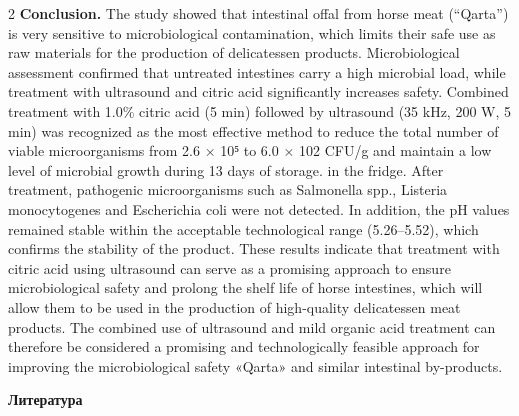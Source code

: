 \begin{multicols}{2}
{\bfseries Conclusion.} The study showed that intestinal offal from horse
meat (``Qarta'') is very sensitive to microbiological contamination,
which limits their safe use as raw materials for the production of
delicatessen products. Microbiological assessment confirmed that
untreated intestines carry a high microbial load, while treatment with
ultrasound and citric acid significantly increases safety. Combined
treatment with 1.0\% citric acid (5 min) followed by ultrasound (35 kHz,
200 W, 5 min) was recognized as the most effective method to reduce the
total number of viable microorganisms from 2.6 × 10⁵ to 6.0 × 102 CFU/g
and maintain a low level of microbial growth during 13 days of storage.
in the fridge. After treatment, pathogenic microorganisms such as
Salmonella spp., Listeria monocytogenes and Escherichia coli were not
detected. In addition, the pH values remained stable within the
acceptable technological range (5.26--5.52), which confirms the
stability of the product. These results indicate that treatment with
citric acid using ultrasound can serve as a promising approach to ensure
microbiological safety and prolong the shelf life of horse intestines,
which will allow them to be used in the production of high-quality
delicatessen meat products. The combined use of ultrasound and mild
organic acid treatment can therefore be considered a promising and
technologically feasible approach for improving the microbiological
safety «Qarta» and similar intestinal by-products.
\end{multicols}

\begin{center}
{\bfseries Литература}
\end{center}


